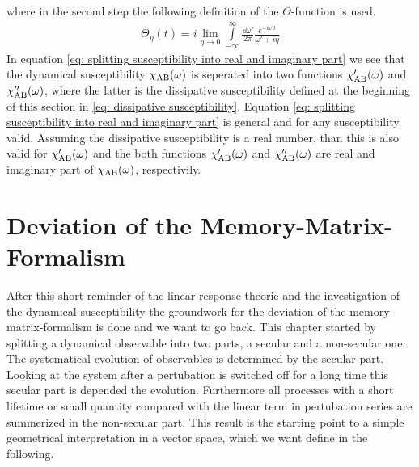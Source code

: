 %
where in the second step the following definition of the $\Theta$-function is used.
%
\begin{align}
	\Theta_{\eta}(t) = i \lim\limits_{\eta \to 0} \int\limits_{-\infty}^{\infty} \frac{\dd{\omega'}}{2\pi} \frac{e^{-i\omega't}}{\omega' + i\eta} 
\end{align}
%
In equation \eqref{eq: splitting susceptibility into real and imaginary part} we see that the dynamical susceptibility $\chi_{\mathrm{AB}}(\omega)$ is seperated into two functions $\chi'_{\mathrm{AB}}(\omega)$ and $\chi''_{\mathrm{AB}}(\omega)$, where the latter is the dissipative susceptibility defined at the beginning of this section in \eqref{eq: dissipative susceptibility}.
Equation \eqref{eq: splitting susceptibility into real and imaginary part} is general and for any susceptibility valid.
Assuming the dissipative susceptibility is a real number, than this is also valid for $\chi'_{\mathrm{AB}}(\omega)$ and the both functions $\chi'_{\mathrm{AB}}(\omega)$ and $\chi''_{\mathrm{AB}}(\omega)$ are real and imaginary part of $\chi_{\mathrm{AB}}(\omega)$, respectivily.
%
%
%
\section{Deviation of the Memory-Matrix-Formalism}
\label{sec: deviation of the memory-matrix-formalism}
%
%
%
After this short reminder of the linear response theorie and the investigation of the dynamical susceptibility the groundwork for the deviation of the memory-matrix-formalism is done and we want to go back.
This chapter started by splitting a dynamical observable into two parts, a secular and a non-secular one.
The systematical evolution of observables is determined by the secular part.
Looking at the system after a pertubation is switched off for a long time this secular part is depended the evolution.
Furthermore all processes with a short lifetime or small quantity compared with the linear term in pertubation series are summerized in the non-secular part.
This result is the starting point to a simple geometrical interpretation in a vector space, which we want define in the following.

